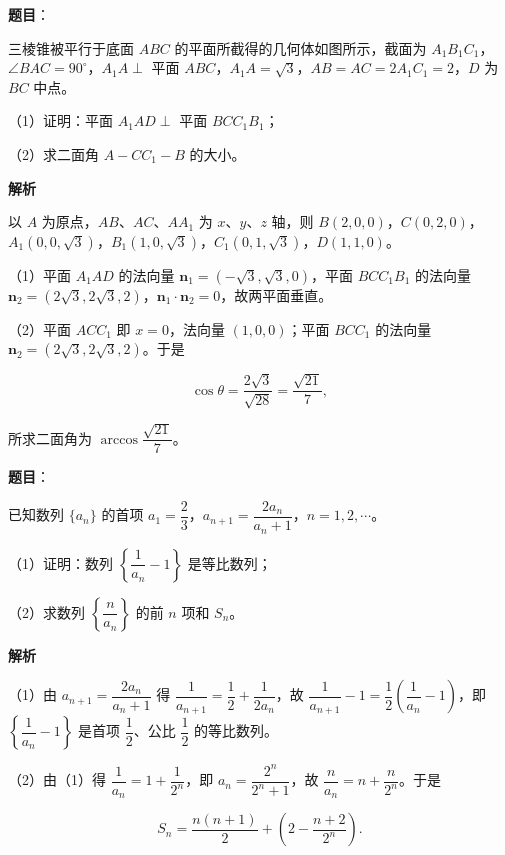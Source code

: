 \begin{answer}

\textbf{题目}：

三棱锥被平行于底面 $ABC$ 的平面所截得的几何体如图所示，截面为 $A_1B_1C_1$，$\angle BAC=90^\circ$，$A_1A\perp$ 平面 $ABC$，$A_1A=\sqrt3$，$AB=AC=2A_1C_1=2$，$D$ 为 $BC$ 中点。

（1）证明：平面 $A_1AD\perp$ 平面 $BCC_1B_1$；

（2）求二面角 $A-CC_1-B$ 的大小。
\nopagebreak[4]
\begin{center}\end{center}
\nopagebreak[4]
\textbf{解析}

以 $A$ 为原点，$AB$、$AC$、$AA_1$ 为 $x$、$y$、$z$ 轴，则 $B(2,0,0)$，$C(0,2,0)$，$A_1(0,0,\sqrt3)$，$B_1(1,0,\sqrt3)$，$C_1(0,1,\sqrt3)$，$D(1,1,0)$。

（1）平面 $A_1AD$ 的法向量 $\boldsymbol n_1=(-\sqrt3,\sqrt3,0)$，平面 $BCC_1B_1$ 的法向量 $\boldsymbol n_2=(2\sqrt3,2\sqrt3,2)$，$\boldsymbol n_1\cdot\boldsymbol n_2=0$，故两平面垂直。

（2）平面 $ACC_1$ 即 $x=0$，法向量 $(1,0,0)$；平面 $BCC_1$ 的法向量 $\boldsymbol n_2=(2\sqrt3,2\sqrt3,2)$。于是

\nopagebreak[4]
\[\cos\theta=\frac{2\sqrt3}{\sqrt{28}}=\frac{\sqrt{21}}7,\]

所求二面角为 $\arccos\dfrac{\sqrt{21}}7$。


\end{answer}
\begin{answer}

\textbf{题目}：

已知数列 $\{a_n\}$ 的首项 $a_1=\dfrac23$，$a_{n+1}=\dfrac{2a_n}{a_n+1}$，$n=1,2,\cdots$。

（1）证明：数列 $\left\{\dfrac1{a_n}-1\right\}$ 是等比数列；

（2）求数列 $\left\{\dfrac n{a_n}\right\}$ 的前 $n$ 项和 $S_n$。

\textbf{解析}

（1）由 $a_{n+1}=\dfrac{2a_n}{a_n+1}$ 得 $\dfrac1{a_{n+1}}=\dfrac12+\dfrac1{2a_n}$，故 $\dfrac1{a_{n+1}}-1=\dfrac12\left(\dfrac1{a_n}-1\right)$，即 $\left\{\dfrac1{a_n}-1\right\}$ 是首项 $\dfrac12$、公比 $\dfrac12$ 的等比数列。

（2）由（1）得 $\dfrac1{a_n}=1+\dfrac1{2^n}$，即 $a_n=\dfrac{2^n}{2^n+1}$，故 $\dfrac n{a_n}=n+\dfrac n{2^n}$。于是

\nopagebreak[4]
\[S_n=\frac{n(n+1)}2+\left(2-\frac{n+2}{2^n}\right).\]


\end{answer}
